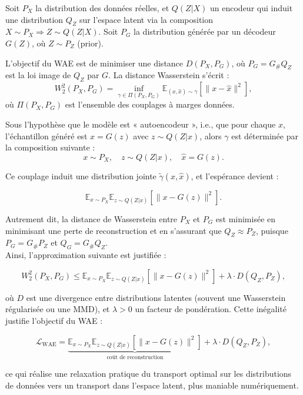 \begin{preuve}
Soit \( P_X \) la distribution des données réelles, et \( Q(Z|X) \) un encodeur qui induit une distribution \( Q_Z \) sur l’espace latent via la composition \( X \sim P_X \Rightarrow Z \sim Q(Z|X) \). Soit \( P_G \) la distribution générée par un décodeur \( G(Z) \), où \( Z \sim P_Z \) (prior).

L’objectif du WAE est de minimiser une distance \( D(P_X, P_G) \), où \( P_G = G_{\#}Q_Z \) est la loi image de \( Q_Z \) par \( G \). La distance Wasserstein s’écrit :
\[
W_2^2(P_X, P_G) = \inf_{\gamma \in \Pi(P_X, P_G)} \mathbb{E}_{(x,\hat{x}) \sim \gamma} \left[ \| x - \hat{x} \|^2 \right],
\]
où \( \Pi(P_X, P_G) \) est l’ensemble des couplages à marges données.

Sous l’hypothèse que le modèle est « autoencodeur », i.e., que pour chaque \( x \), l’échantillon généré est \( \hat{x} = G(z) \) avec \( z \sim Q(Z|x) \), alors \( \gamma \) est déterminée par la composition suivante :
\[
x \sim P_X, \quad z \sim Q(Z|x), \quad \hat{x} = G(z).
\]

Ce couplage induit une distribution jointe \( \tilde{\gamma}(x,\hat{x}) \), et l’espérance devient :

\[
\mathbb{E}_{x \sim P_X} \mathbb{E}_{z \sim Q(Z|x)} \left[ \| x - G(z) \|^2 \right].
\]

Autrement dit, la distance de Wasserstein entre \( P_X \) et \( P_G \) est minimisée en minimisant une perte de reconstruction et en s’assurant que \( Q_Z \approx P_Z \), puisque \( P_G = G_{\#}P_Z \) et \( Q_G = G_{\#}Q_Z \).\\

Ainsi, l’approximation suivante est justifiée :

\[
W_2^2(P_X, P_G) \leq \mathbb{E}_{x \sim P_X} \mathbb{E}_{z \sim Q(Z|x)} \left[ \| x - G(z) \|^2 \right] + \lambda \cdot D(Q_Z, P_Z),
\]

où \( D \) est une divergence entre distributions latentes (souvent une Wasserstein régularisée ou une MMD), et \( \lambda > 0 \) un facteur de pondération. Cette inégalité justifie l'objectif du WAE :

\[
\mathcal{L}_{\text{WAE}} = \underbrace{\mathbb{E}_{x \sim P_X} \mathbb{E}_{z \sim Q(Z|x)} \left[ \| x - G(z) \|^2 \right]}_{\text{coût de reconstruction}} + \lambda \cdot D(Q_Z, P_Z),
\]

ce qui réalise une relaxation pratique du transport optimal sur les distributions de données vers un transport dans l’espace latent, plus maniable numériquement.
\end{preuve}


